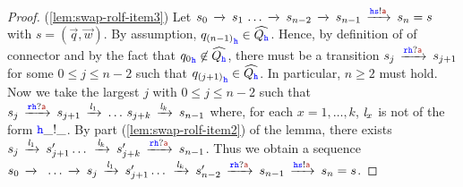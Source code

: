 \begin{proof}
(\ref{lem:swap-rolf-item3})
Let $s_0\lts{}  s_1\,\ldots \lts{} s_{n-2}  \lts{} s_{n-1}\lts{\HH\tts!\msg[a]}s_n=s$ with $s = (\vec{q},\vec{w})$.
By assumption, ${q_{(n-1)}}_{{\mathtt{\color{blue}{ {h}}}}}\in\widehat{Q_{{\mathtt{\color{blue}{ {h}}}}}}$.
Hence, by definition of of connector
 and by the fact that ${q_0}_{{\mathtt{\color{blue}{ {h}}}}}\not\in\widehat{Q_{{\mathtt{\color{blue}{ {h}}}}}}$,
 there must be a transition $s_j \lts{\ttr\HH?\msg[a]}s_{j+1}$ for
 some $0\leq j \leq n-2$ such that ${q_{(j+1)}}_{\mathtt{\color{blue}{ {h}}}}\in\widehat{Q_{\mathtt{\color{blue}{ {h}}}}}$. 
In particular, $n \geq 2$ must hold.
Now we take the largest $j$ with $0\leq j \leq n-2$ such that
 $s_j  \lts{\ttr\HH?\msg[a]} s_{j+1}\lts{\elle_1}\ldots\, s_{j+k}\lts{\elle_{k}}s_{n-1}$
 where, for each $x = 1,\ldots,k$,  $\mathit{l}_x$ is not of the form ${\mathtt{\color{blue}{ {h}}}}\_!\_$.
By part (\ref{lem:swap-rolf-item2}) of the lemma, there exists
 $s_j  \lts{\elle_1}s'_{j+1} \ldots\,  \lts{\elle_k} s'_{j+k} \lts{\ttr\HH?\msg[a]} s_{n-1}$. Thus we obtain a sequence
$s_0\lts{}\,\,\ldots \lts{}s_j  \lts{\elle_1}s'_{j+1} \ldots\,  \lts{\elle_k} s'_{n-2}\lts{\ttr\HH?\msg[a]}s_{n-1}\lts{\HH\tts!\msg[a]}s_n=s$.
\end{proof}



